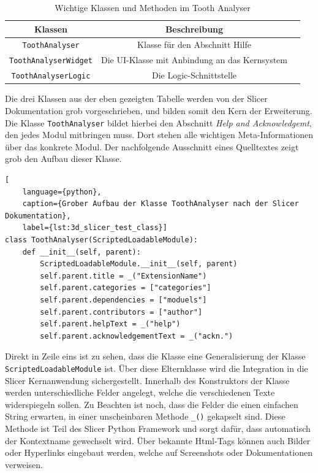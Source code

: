 \begin{table}[h]
	\centering
	\begin{tabular}{|c|c|c|}
		\hline
		\textbf{Klassen}             & \textbf{Beschreibung}                              \\
		\hline
		\texttt{ToothAnalyser}       & Klasse für den Abschnitt Hilfe                     \\
		\hline
		\texttt{ToothAnalyserWidget} & Die \ac{UI}-Klasse mit Anbindung an das Kernsystem \\
		\hline
		\texttt{ToothAnalyserLogic}  & Die Logic-Schnittstelle                            \\
		\hline
	\end{tabular}
	\caption{Wichtige Klassen und Methoden im Tooth Analyser}
	\label{tab:methoden_klassen}
\end{table}

Die drei Klassen aus der eben gezeigten Tabelle werden von der Slicer
Dokumentation grob vorgeschrieben, und bilden somit den Kern der Erweiterung.
Die Klasse \texttt{ToothAnalyser} bildet hierbei den Abschnitt \textit{Help and
Acknowledgemt}, den jedes Modul mitbringen muss. Dort stehen alle wichtigen Meta-Informationen
über das konkrete Modul. Der nachfolgende Ausschnitt eines Quelltextes zeigt grob
den Aufbau dieser Klasse.

\begin{lstlisting}[
    language={python},
    caption={Grober Aufbau der Klasse ToothAnalyser nach der Slicer Dokumentation},
    label={lst:3d_slicer_test_class}]
class ToothAnalyser(ScriptedLoadableModule):
    def __init__(self, parent):
	    ScriptedLoadableModule.__init__(self, parent)
	    self.parent.title = _("ExtensionName")
	    self.parent.categories = ["categories"]
	    self.parent.dependencies = ["moduels"]
	    self.parent.contributors = ["author"]
	    self.parent.helpText = _("help")
	    self.parent.acknowledgementText = _("ackn.")
\end{lstlisting}

Direkt in Zeile eins ist zu sehen, dass die Klasse eine Generalisierung der Klasse
\texttt{ScriptedLoadableModule} ist. Über diese Elternklasse wird die Integration
in die Slicer Kernanwendung sichergestellt. Innerhalb des Konstruktors der
Klasse werden unterschiedliche Felder angelegt, welche die verschiedenen Texte widerspiegeln
sollen. Zu Beachten ist noch, dass die Felder die einen einfachen String erwarten,
in einer unscheinbaren Methode \texttt{\_()} gekapselt sind. Diese Methode ist
Teil des Slicer Python Framework und sorgt dafür, dass automatisch der Kontextname
gewechselt wird. Über bekannte Html-Tags können auch Bilder oder Hyperlinks
eingebaut werden, welche auf Screenshots oder Dokumentationen verweisen.

